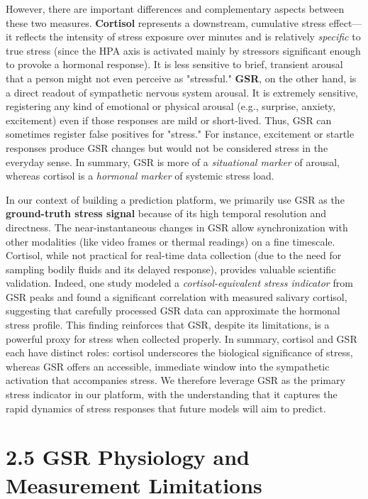 However, there are important differences and complementary aspects between these two measures. \textbf{Cortisol} represents a downstream, cumulative stress effect—it reflects the intensity of stress exposure over minutes and is relatively \textit{specific} to true stress (since the HPA axis is activated mainly by stressors significant enough to provoke a hormonal response). It is less sensitive to brief, transient arousal that a person might not even perceive as "stressful." \textbf{GSR}, on the other hand, is a direct readout of sympathetic nervous system arousal. It is extremely sensitive, registering any kind of emotional or physical arousal (e.g., surprise, anxiety, excitement) even if those responses are mild or short-lived\cite{GSRPPGMachineLearning2024}. Thus, GSR can sometimes register false positives for "stress." For instance, excitement or startle responses produce GSR changes but would not be considered stress in the everyday sense. In summary, GSR is more of a \textit{situational marker} of arousal, whereas cortisol is a \textit{hormonal marker} of systemic stress load\cite{SimulatorValidityPhysiological2025}.

In our context of building a prediction platform, we primarily use GSR as the \textbf{ground-truth stress signal} because of its high temporal resolution and directness. The near-instantaneous changes in GSR allow synchronization with other modalities (like video frames or thermal readings) on a fine timescale. Cortisol, while not practical for real-time data collection (due to the need for sampling bodily fluids and its delayed response), provides valuable scientific validation. Indeed, one study modeled a \textit{cortisol-equivalent stress indicator} from GSR peaks and found a significant correlation with measured salivary cortisol\cite{CortisolStressIndicator2020}, suggesting that carefully processed GSR data can approximate the hormonal stress profile. This finding reinforces that GSR, despite its limitations, is a powerful proxy for stress when collected properly. In summary, cortisol and GSR each have distinct roles: cortisol underscores the biological significance of stress, whereas GSR offers an accessible, immediate window into the sympathetic activation that accompanies stress. We therefore leverage GSR as the primary stress indicator in our platform, with the understanding that it captures the rapid dynamics of stress responses that future models will aim to predict.

\section{2.5 GSR Physiology and Measurement Limitations}

